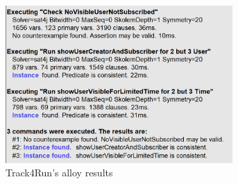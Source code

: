 \begin{figure}[H]
\includegraphics[width=\linewidth, height=6cm, keepaspectratio]{./Images/Alloy/track4run_v2_results.png}
\centering
\caption{Track4Run's alloy results}
\end{figure}